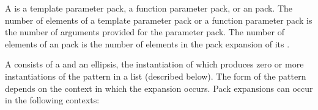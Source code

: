 \pnum
A  is
a template parameter pack,
a function parameter pack,
or an  pack.
The number of elements of a template parameter pack
or a function parameter pack
is the number of arguments provided for the parameter pack.
The number of elements of an  pack
is the number of elements in the pack expansion of its .

\pnum
{}%
A 
consists of a  and an ellipsis, the instantiation of which
produces zero or more instantiations of the pattern in a list (described below).
The form of the pattern
depends on the context in which the expansion occurs. Pack
expansions can occur in the following contexts:

